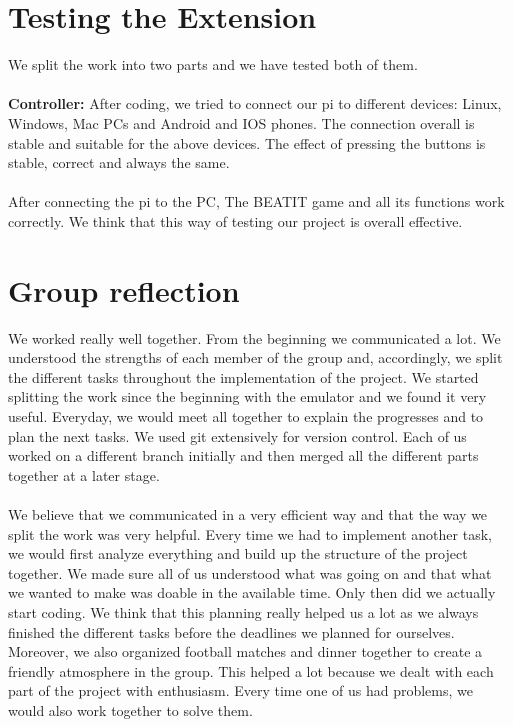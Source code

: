 \documentclass[a4paper]{article}
\begin{document}
\section{Testing the Extension}
We split the work into two parts and we have tested both of them.
\\\\
\textbf{Controller:} After coding, we tried to connect our pi to different devices: Linux, Windows, Mac PCs and Android and IOS phones. The connection overall is stable and suitable for the above devices. The effect of pressing the buttons is stable, correct and always the same.
\\\\
After connecting the pi to the PC, The BEATIT game and all its functions work correctly.
We think that this way of testing our project is overall effective.
\\

\section{Group reflection}
We worked really well together. From the beginning we communicated a lot. We understood the strengths of each member of the group and, accordingly, we split the different tasks throughout the implementation of the project. We started splitting the work since the beginning with the emulator and we found it very useful. Everyday, we would meet all together to explain the progresses and to plan the next tasks. We used git extensively for version control. Each of us worked on a different branch initially and then merged all the different parts together at a later stage. 
\\\\
We believe that we communicated in a very efficient way and that the way we split the work was very helpful. Every time we had to implement another task, we would first analyze everything and build up the structure of the project together. We made sure all of us understood what was going on and that what we wanted to make was doable in the available time. Only then did we actually start coding. We think that this planning really helped us a lot as we always finished the different tasks before the deadlines we planned for ourselves. Moreover, we also organized football matches and dinner together to create a friendly atmosphere in the group. This helped a lot because we dealt with each part of the project with enthusiasm. Every time one of us had problems, we would also work together to solve them.
\end{document}

